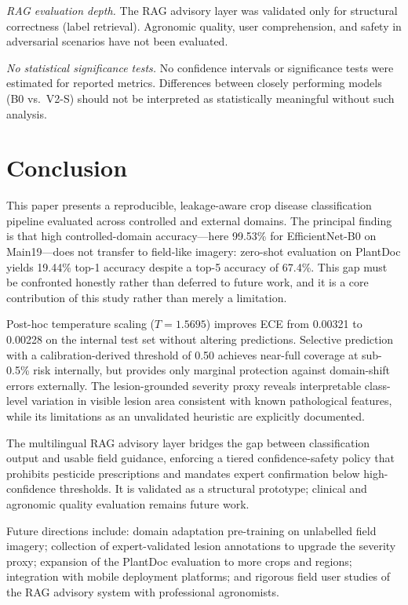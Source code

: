 \documentclass[conference]{IEEEtran}
\begin{document}
\textit{RAG evaluation depth.} The RAG advisory layer was validated only for
structural correctness (label retrieval). Agronomic quality, user comprehension,
and safety in adversarial scenarios have not been evaluated.

\textit{No statistical significance tests.} No confidence intervals or
significance tests were estimated for reported metrics. Differences between
closely performing models (B0 vs.\ V2-S) should not be interpreted as
statistically meaningful without such analysis.

\section{Conclusion}

This paper presents a reproducible, leakage-aware crop disease classification
pipeline evaluated across controlled and external domains. The principal finding
is that high controlled-domain accuracy---here 99.53\% for EfficientNet-B0 on
Main19---does not transfer to field-like imagery: zero-shot evaluation on PlantDoc
yields 19.44\% top-1 accuracy despite a top-5 accuracy of 67.4\%. This gap must
be confronted honestly rather than deferred to future work, and it is a core
contribution of this study rather than merely a limitation.

Post-hoc temperature scaling ($T=1.5695$) improves ECE from 0.00321 to 0.00228
on the internal test set without altering predictions. Selective prediction with
a calibration-derived threshold of 0.50 achieves near-full coverage at sub-0.5\%
risk internally, but provides only marginal protection against domain-shift
errors externally. The lesion-grounded severity proxy reveals interpretable
class-level variation in visible lesion area consistent with known pathological
features, while its limitations as an unvalidated heuristic are explicitly
documented.

The multilingual RAG advisory layer bridges the gap between classification output
and usable field guidance, enforcing a tiered confidence-safety policy that
prohibits pesticide prescriptions and mandates expert confirmation below
high-confidence thresholds. It is validated as a structural prototype; clinical
and agronomic quality evaluation remains future work.

Future directions include: domain adaptation pre-training on unlabelled field
imagery; collection of expert-validated lesion annotations to upgrade the
severity proxy; expansion of the PlantDoc evaluation to more crops and regions;
integration with mobile deployment platforms; and rigorous field user studies of
the RAG advisory system with professional agronomists.
\end{document}
